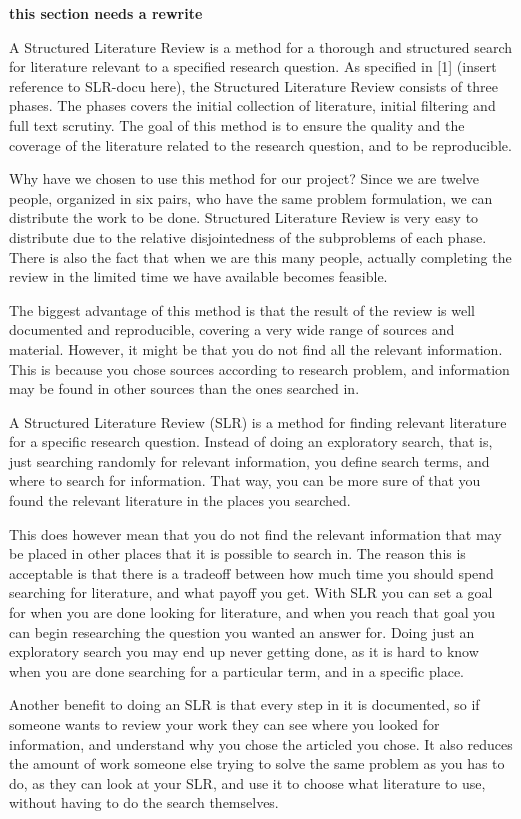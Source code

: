 \textbf{this section needs a rewrite}

A Structured Literature Review is a method for a thorough and structured search for literature relevant to a specified research question. As specified in [1] (insert reference to SLR-docu here), the Structured Literature Review consists of three phases. The phases covers the initial collection of literature, initial filtering and full text scrutiny. The goal of this method is to ensure the quality and the coverage of the literature related to the research question, and to be reproducible.

Why have we chosen to use this method for our project? Since we are twelve people, organized in six pairs, who have the same problem formulation, we can distribute the work to be done. Structured Literature Review is very easy to distribute due to the relative disjointedness of the subproblems of each phase. There is also the fact that when we are this many people, actually completing the review in the limited time we have available becomes feasible.

The biggest advantage of this method is that the result of the review is well documented and reproducible, covering a very wide range of sources and material. However, it might be that you do not find all the relevant information. This is because you chose sources according to research problem, and information may be found in other sources than the ones searched in.

A Structured Literature Review (SLR) is a method for finding relevant literature for a specific research question. Instead of doing an exploratory search, that is, just searching randomly for relevant information, you define search terms, and where to search for information. That way, you can be more sure of that you found the relevant literature in the places you searched. 

This does however mean that you do not find the relevant information that may be placed in other places that it is possible to search in. The reason this is acceptable is that there is a tradeoff between how much time you should spend searching for literature, and what payoff you get. With SLR you can set a goal for when you are done looking for literature, and when you reach that goal you can begin researching the question you wanted an answer for. Doing just an exploratory search you may end up never getting done, as it is hard to know when you are done searching for a particular term, and in a specific place.

Another benefit to doing an SLR is that every step in it is documented, so if someone wants to review your work they can see where you looked for information, and understand why you chose the articled you chose. It also reduces the amount of work someone else trying to solve the same problem as you has to do, as they can look at your SLR, and use it to choose what literature to use, without having to do the search themselves. 
